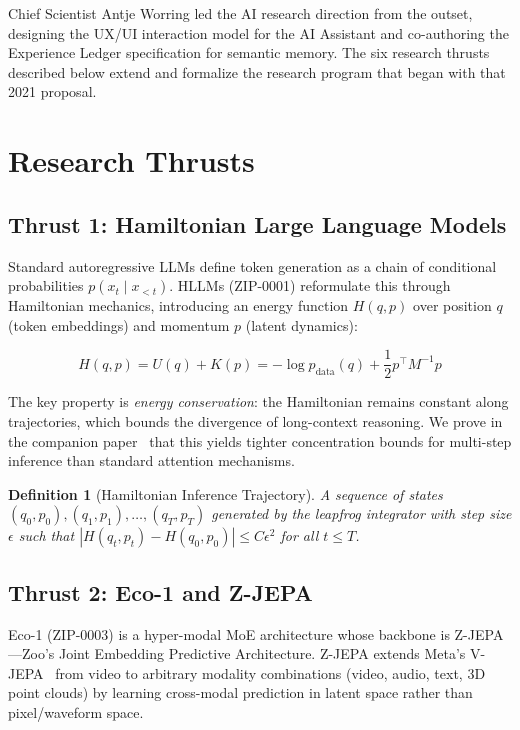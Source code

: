 \documentclass[11pt,letterpaper]{article}
\newtheorem{definition}{Definition}[section]
\begin{document}
Chief Scientist Antje Worring led the AI research direction from the outset, designing the UX/UI interaction model for the AI Assistant and co-authoring the Experience Ledger specification for semantic memory. The six research thrusts described below extend and formalize the research program that began with that 2021 proposal.

\section{Research Thrusts}

\subsection{Thrust 1: Hamiltonian Large Language Models}

Standard autoregressive LLMs define token generation as a chain of conditional probabilities $p(x_t \mid x_{<t})$. HLLMs (ZIP-0001) reformulate this through Hamiltonian mechanics, introducing an energy function $H(q, p)$ over position $q$ (token embeddings) and momentum $p$ (latent dynamics):

\begin{equation}
H(q, p) = U(q) + K(p) = -\log p_{\text{data}}(q) + \frac{1}{2} p^\top M^{-1} p
\label{eq:hamiltonian}
\end{equation}

The key property is \emph{energy conservation}: the Hamiltonian remains constant along trajectories, which bounds the divergence of long-context reasoning. We prove in the companion paper~\cite{zoo_hllm} that this yields tighter concentration bounds for multi-step inference than standard attention mechanisms.

\begin{definition}[Hamiltonian Inference Trajectory]
A sequence of states $(q_0, p_0), (q_1, p_1), \ldots, (q_T, p_T)$ generated by the leapfrog integrator with step size $\epsilon$ such that $|H(q_t, p_t) - H(q_0, p_0)| \leq C\epsilon^2$ for all $t \leq T$.
\end{definition}

\subsection{Thrust 2: Eco-1 and Z-JEPA}

Eco-1 (ZIP-0003) is a hyper-modal MoE architecture whose backbone is Z-JEPA---Zoo's Joint Embedding Predictive Architecture. Z-JEPA extends Meta's V-JEPA~\cite{bardes2024vjepa} from video to arbitrary modality combinations (video, audio, text, 3D point clouds) by learning cross-modal prediction in latent space rather than pixel/waveform space.
\end{document}
